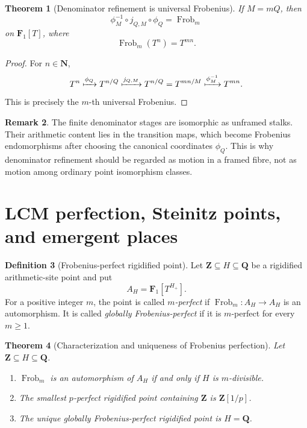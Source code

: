 \documentclass[11pt]{amsart}
\numberwithin{equation}{section}
\newtheorem{theorem}{Theorem}[section]
\theoremstyle{definition}
\newtheorem{definition}[theorem]{Definition}
\newtheorem{remark}[theorem]{Remark}
\newcommand{\Z}{\mathbf Z}
\newcommand{\Q}{\mathbf Q}
\newcommand{\N}{\mathbf N}
\newcommand{\Fone}{\mathbf F_1}
\newcommand{\Frob}{\operatorname{Frob}}
\begin{document}
\begin{theorem}[Denominator refinement is universal Frobenius]
\label{thm:denominator-frobenius}
If $M=mQ$, then
\[
\boxed{
\phi_M^{-1}\circ j_{Q,M}\circ\phi_Q
=\operatorname{Frob}_m
}
\]
on $\Fone[T]$, where
\[
\operatorname{Frob}_m(T^n)=T^{mn}.
\]
\end{theorem}

\begin{proof}
For $n\in\N$,
\[
T^n\xmapsto{\phi_Q}T^{n/Q}
\xmapsto{j_{Q,M}}T^{n/Q}
=T^{mn/M}
\xmapsto{\phi_M^{-1}}T^{mn}.
\]
This is precisely the $m$-th universal Frobenius.
\end{proof}

\begin{remark}
The finite denominator stages are isomorphic as unframed stalks.  Their
arithmetic content lies in the transition maps, which become Frobenius
endomorphisms after choosing the canonical coordinates $\phi_Q$.  This is
why denominator refinement should be regarded as motion in a framed fibre,
not as motion among ordinary point isomorphism classes.
\end{remark}

\section{LCM perfection, Steinitz points, and emergent places}
\label{sec:lcm-perfection}

\begin{definition}[Frobenius-perfect rigidified point]
\label{def:frobenius-perfect-point}
Let $\Z\subseteq H\subseteq\Q$ be a rigidified arithmetic-site point and
put
\[
A_H=\Fone[T^{H_+}].
\]
For a positive integer $m$, the point is called \emph{$m$-perfect} if
$\Frob_m:A_H\to A_H$ is an automorphism.  It is called \emph{globally
Frobenius-perfect} if it is $m$-perfect for every $m\geq1$.
\end{definition}

\begin{theorem}[Characterization and uniqueness of Frobenius perfection]
\label{thm:unique-frobenius-perfect-point}
Let $\Z\subseteq H\subseteq\Q$.
\begin{enumerate}[label=\textup{(\roman*)}]
\item $\Frob_m$ is an automorphism of $A_H$ if and only if $H$ is
$m$-divisible.
\item The smallest $p$-perfect rigidified point containing $\Z$ is
$\Z[1/p]$.
\item The unique globally Frobenius-perfect rigidified point is $H=\Q$.
\end{enumerate}
\end{theorem}
\end{document}
